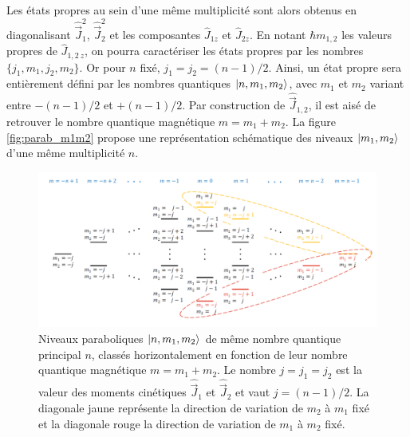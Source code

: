 Les états propres au sein d'une même multiplicité sont alors obtenus en diagonalisant $\hat{\vec{J}}_1^2$, $\hat{\vec{J}}_2^2$ et les composantes $\hat{J}_{1z}$ et $\hat{J}_{2z}$.
En notant $\hbar m_{1,2}$ les valeurs propres de $\hat{J}_{1,2~z}$, on pourra caractériser les états propres par les nombres $\{j_1,m_1,j_2,m_2\}$.
Or pour $n$ fixé, $j_1=j_2=(n-1)/2$. Ainsi, un état propre sera entièrement défini par les nombres quantiques $\ket{n,m_1,m_2}$, avec $m_1$ et $m_2$ variant entre $-(n-1)/2$ et $+(n-1)/2$.
Par construction de $\hat{\vec{J}}_{1,2}$, il est aisé de retrouver le nombre quantique magnétique $m=m_1+m_2$.
La figure \eqref{fig:parab_m1m2} propose une représentation schématique des niveaux $\ket{m_1,m_2}$ d'une même multiplicité $n$.

\begin{figure}[!h]
\centering
\includegraphics[width=1.\linewidth]{figures/echelle_parabolique_m1m2}
\caption[Échelle des niveaux paraboliques $\ket{n,m_1,m_2}$]{
Niveaux paraboliques $\ket{n,m_1,m_2}$ de même nombre quantique principal $n$, classés horizontalement en fonction de leur nombre quantique magnétique $m=m_1+m_2$. Le nombre $j=j_1=j_2$ est la valeur des moments cinétiques $\hat{\vec{J}}_1$ et $\hat{\vec{J}}_2$ et vaut $j=(n-1)/2$.
La diagonale jaune représente la direction de variation de $m_2$ à $m_1$ fixé et la diagonale rouge la direction de variation de $m_1$ à $m_2$ fixé.
}
\label{fig:parab_m1m2}
\end{figure}



